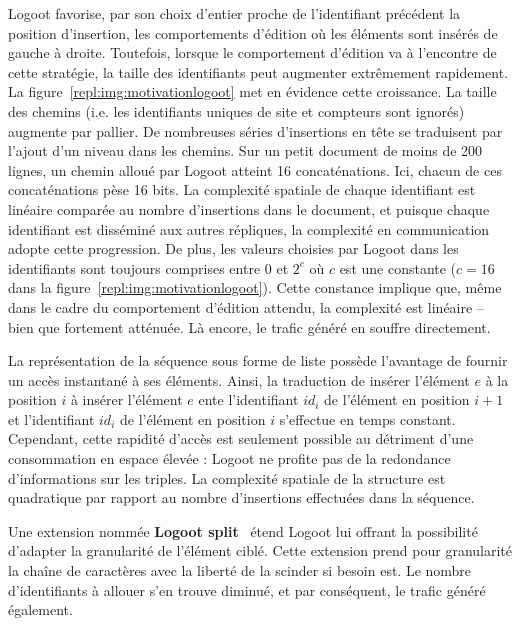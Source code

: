 \noindent Logoot favorise, par son choix d'entier proche de l'identifiant
précédent la position d'insertion, les comportements d'édition où les éléments
sont insérés de gauche à droite. Toutefois, lorsque le comportement d'édition va
à l'encontre de cette stratégie, la taille des identifiants peut augmenter
extrêmement rapidement. La figure~\ref{repl:img:motivationlogoot} met en
évidence cette croissance. La taille des chemins (i.e. les identifiants uniques
de site et compteurs sont ignorés) augmente par pallier. De nombreuses séries
d'insertions en tête se traduisent par l'ajout d'un niveau dans les chemins. Sur
un petit document de moins de 200 lignes, un chemin alloué par Logoot atteint 16
concaténations. Ici, chacun de ces concaténations pèse 16 bits.  La complexité
spatiale de chaque identifiant est linéaire comparée au nombre d'insertions dans
le document, et puisque chaque identifiant est disséminé aux autres répliques,
la complexité en communication adopte cette progression. De plus, les valeurs
choisies par Logoot dans les identifiants sont toujours comprises entre $0$ et
$2^{c}$ où $c$ est une constante ($c = 16$ dans la
figure~\ref{repl:img:motivationlogoot}). Cette constance implique que, même dans
le cadre du comportement d'édition attendu, la complexité est linéaire -- bien
que fortement atténuée. Là encore, le trafic généré en souffre directement.

\noindent La représentation de la séquence sous forme de liste possède
l'avantage de fournir un accès instantané à ses éléments. Ainsi, la traduction
de \og insérer l'élément $e$ à la position $i$ \fg à \og insérer l'élément $e$
ente l'identifiant $id_{i}$ de l'élément en position $i+1$ et l'identifiant
$id_i$ de l'élément en position $i$ \fg s'effectue en temps constant.
Cependant, cette rapidité d'accès est seulement possible au détriment d'une
consommation en espace élevée : Logoot ne profite pas de la redondance
d'informations sur les triples. La complexité spatiale de la structure est
quadratique par rapport au nombre d'insertions effectuées dans la séquence.

\noindent Une extension nommée \textbf{Logoot split}~\cite{andre2013supporting}
étend Logoot lui offrant la possibilité d'adapter la granularité de l'élément
ciblé.  Cette extension prend pour granularité la chaîne de caractères avec la
liberté de la scinder si besoin est. Le nombre d'identifiants à allouer s'en
trouve diminué, et par conséquent, le trafic généré également. 

